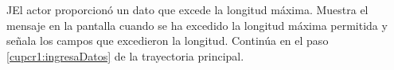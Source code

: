 \begin{UCtrayectoriaA}{J}{El actor proporcionó un dato que excede la longitud máxima.}
	\UCpaso[\UCsist] Muestra el mensaje  en la pantalla 
	cuando se ha excedido la longitud máxima permitida y señala los campos que excedieron la longitud.
	\UCpaso[] Continúa en el paso \ref{cupcr1:ingresaDatos} de la trayectoria principal.
\end{UCtrayectoriaA}
